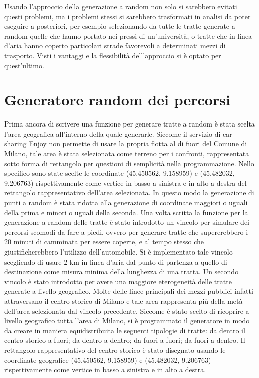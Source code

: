 Usando l'approccio della generazione a random non solo si sarebbero evitati questi problemi, ma i problemi stessi si sarebbero trasformati in analisi da poter eseguire a posteriori, per esempio selezionando da tutte le tratte generate a random quelle che hanno portato nei pressi di un'università, o tratte che in linea d'aria hanno coperto particolari strade favorevoli a determinati mezzi di trasporto. Visti i vantaggi e la flessibilità dell'approccio si è optato per quest'ultimo.

\section{Generatore random dei percorsi}

Prima ancora di scrivere una funzione per generare tratte a random è stata scelta l'area geografica all'interno della quale generarle. Siccome il servizio di car sharing Enjoy non permette di usare la propria flotta al di fuori del Comune di Milano, tale area è stata selezionata come terreno per i confronti, rappresentata sotto forma di rettangolo per questioni di semplicità nella programmazione. Nello specifico sono state scelte le coordinate (45.450562\textdegree, 9.158959\textdegree) e (45.482032\textdegree, 9.206763\textdegree) rispettivamente come vertice in basso a sinistra e in alto a destra del rettangolo rappresentativo dell'area selezionata. In questo modo la generazione di punti a random è stata ridotta alla generazione di coordinate maggiori o uguali della prima e minori o uguali della seconda. Una volta scritta la funzione per la generazione a random delle tratte è stato introdotto un vincolo per simulare dei percorsi scomodi da fare a piedi, ovvero per generare tratte che supererebbero i 20 minuti di camminata per essere coperte, e al tempo stesso che giustificherebbero l'utilizzo dell'automobile. Si è implementato tale vincolo scegliendo di usare 2 km in linea d'aria dal punto di partenza a quello di destinazione come misura minima della lunghezza di una tratta. Un secondo vincolo è stato introdotto per avere una maggiore eterogeneità delle tratte generate a livello geografico. Molte delle linee principali dei mezzi pubblici infatti attraversano il centro storico di Milano e tale area rappresenta più della metà dell'area selezionata dal vincolo precedente. Siccome è stato scelto di ricoprire a livello geografico tutta l'area di Milano, si è programmato il generatore in modo da creare in maniera equidistribuita le seguenti tipologie di tratte: da dentro il centro storico a fuori; da dentro a dentro; da fuori a fuori; da fuori a dentro. Il rettangolo rappresentativo del centro storico è stato disegnato usando le coordinate geografice (45.450562\textdegree, 9.158959\textdegree) e (45.482032\textdegree, 9.206763\textdegree) rispettivamente come vertice in basso a sinistra e in alto a destra.


